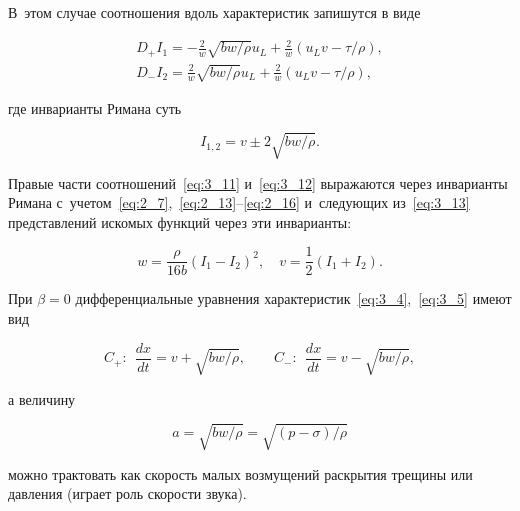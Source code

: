 В~этом случае соотношения вдоль характеристик запишутся в виде

\begin{gather}

 D_+I_1= -\frac{2}{w} \sqrt{{bw}/{\rho}} u_L + \frac{2}{w} \left(u_L v - {\tau}/{\rho}\right), \label{eq:3_11} 

 \\

 D_-I_2 = \frac{2}{w} \sqrt{{bw}/{\rho}} u_L + \frac{2}{w} \left(u_L v - {\tau}/{\rho}\right), \label{eq:3_12}

\end{gather}

где инварианты Римана суть

\begin{equation}

 I_{1,2}= v \pm 2 \sqrt{{bw}/{\rho}}. \label{eq:3_13}

\end{equation}



Правые части соотношений~\eqref{eq:3_11} и~\eqref{eq:3_12} выражаются через инварианты Римана с~учетом~\eqref{eq:2_7},~\eqref{eq:2_13}--\eqref{eq:2_16} и~следующих из~\eqref{eq:3_13} представлений искомых функций через эти инварианты:

$$

w  = \frac{\rho }{16b} \left(I_1 - I_2\right)^2 , \quad  v = \frac12{\left(I_1+I_2\right)}. 

$$



При $\beta = 0$ дифференциальные уравнения характеристик~\eqref{eq:3_4},~\eqref{eq:3_5} имеют вид

\begin{equation}

C_+: ~~\frac{dx}{dt}  = v + \sqrt{{bw}/{\rho}}, \qquad  C_-: ~~ \frac{dx}{dt}  = v - \sqrt{{bw}/{\rho}}, \label{eq:3_14}

\end{equation}

а величину

\begin{equation}

a= \sqrt{{bw}/{\rho}} = \sqrt{{\left(p-\sigma\right)}/{\rho}} \label{eq:3_15}

\end{equation}

можно трактовать как скорость малых возмущений раскрытия трещины или давления (играет роль скорости звука). 

